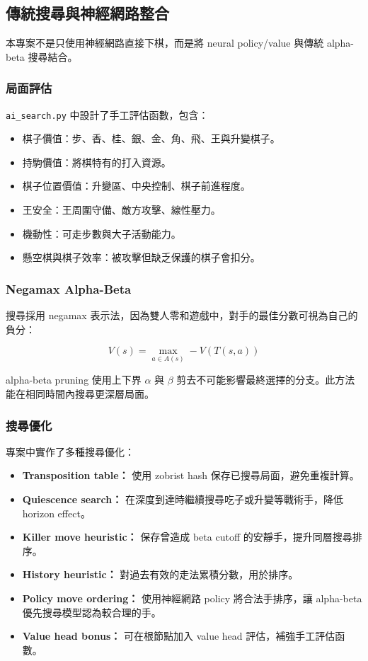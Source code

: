 \documentclass[12pt,a4paper,fontset=none]{ctexart}
\begin{document}
\subsection{傳統搜尋與神經網路整合}
本專案不是只使用神經網路直接下棋，而是將 neural policy/value 與傳統 alpha-beta 搜尋結合。

\subsubsection{局面評估}
\texttt{ai\_search.py} 中設計了手工評估函數，包含：

\begin{itemize}
  \item 棋子價值：步、香、桂、銀、金、角、飛、王與升變棋子。
  \item 持駒價值：將棋特有的打入資源。
  \item 棋子位置價值：升變區、中央控制、棋子前進程度。
  \item 王安全：王周圍守備、敵方攻擊、線性壓力。
  \item 機動性：可走步數與大子活動能力。
  \item 懸空棋與棋子效率：被攻擊但缺乏保護的棋子會扣分。
\end{itemize}

\subsubsection{Negamax Alpha-Beta}
搜尋採用 negamax 表示法，因為雙人零和遊戲中，對手的最佳分數可視為自己的負分：

\[
V(s) = \max_{a \in A(s)} -V(T(s,a))
\]

alpha-beta pruning 使用上下界 $\alpha$ 與 $\beta$ 剪去不可能影響最終選擇的分支。此方法能在相同時間內搜尋更深層局面。

\subsubsection{搜尋優化}
專案中實作了多種搜尋優化：

\begin{itemize}
  \item \textbf{Transposition table：} 使用 zobrist hash 保存已搜尋局面，避免重複計算。
  \item \textbf{Quiescence search：} 在深度到達時繼續搜尋吃子或升變等戰術手，降低 horizon effect。
  \item \textbf{Killer move heuristic：} 保存曾造成 beta cutoff 的安靜手，提升同層搜尋排序。
  \item \textbf{History heuristic：} 對過去有效的走法累積分數，用於排序。
  \item \textbf{Policy move ordering：} 使用神經網路 policy 將合法手排序，讓 alpha-beta 優先搜尋模型認為較合理的手。
  \item \textbf{Value head bonus：} 可在根節點加入 value head 評估，補強手工評估函數。
\end{itemize}
\end{document}
